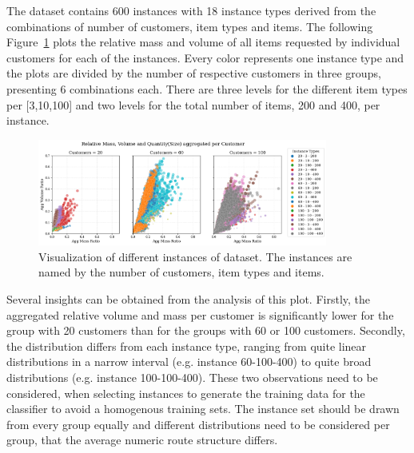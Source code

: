 The dataset contains 600 instances with 18 instance types derived from the combinations
of number of customers, item types and items. The following Figure~\ref{fig:krebs_dataset_analysis_detailes} plots
the relative mass and volume of all items requested by individual customers for each of the instances. Every color
represents one instance type and the plots are divided by the number of respective customers in three groups, presenting
6 combinations each. There are three levels for the different item types per [3,10,100] and two levels for the total
number of items, 200 and 400, per instance.
\begin{figure}[ht]
    \centering
    \includegraphics[width=0.85\textwidth]{pictures/krebs_instances_detailed.png}
    \caption[Visualization of different instances of \textcite{krebs_advanced_2021} dataset.]{Visualization of different instances of \krebsADataSetText dataset.
        The instances are named by the number of customers, item types and items.}
    \label{fig:krebs_dataset_analysis_detailes}
\end{figure}%
Several insights can be obtained from the analysis of this plot. Firstly, the aggregated relative
volume and mass per customer is significantly lower for the group with 20 customers than for the groups with 60 or 100 customers.
Secondly, the distribution differs from each instance type, ranging from quite linear distributions in a narrow
interval (e.g. instance 60-100-400) to quite broad distributions (e.g. instance 100-100-400). These two observations need to be considered,
when selecting instances to generate the training data for the classifier to avoid a homogenous training sets.
The instance set should be drawn from every group equally and different distributions need to be considered per group,
that the average numeric route structure differs.

\subsubsection{\gendreauDataSetText}

